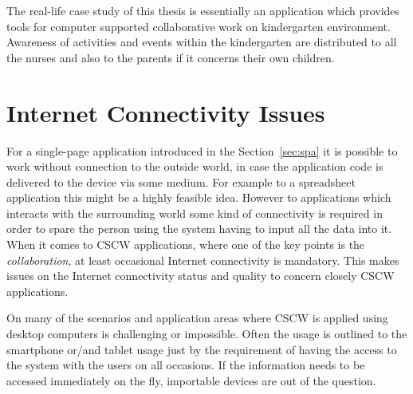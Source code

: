 The real-life case study of this thesis is essentially an application which provides tools for computer supported collaborative work on kindergarten environment. Awareness of activities and events within the kindergarten are distributed to all the nurses and also to the parents if it concerns their own children. 







\section{Internet Connectivity Issues}




For a single-page application introduced in the Section~\ref{sec:spa} it is possible to work without connection to the outside world, in case the application code is delivered to the device via some medium. For example to a spreadsheet application this might be a highly feasible idea. However to applications which interacts with the surrounding world some kind of connectivity is required in order to spare the person using the system having to input all the data into it. When it comes to CSCW applications, where one of the key points is the \textit{collaboration}, at least occasional Internet connectivity is mandatory. This makes issues on the Internet connectivity status and quality to concern closely CSCW applications. %

On many of the scenarios and application areas where CSCW is applied using desktop computers is challenging or impossible. Often the usage is outlined to the smartphone or/and tablet usage just by the requirement of having the access to the system with the users on all occasions. If the information needs to be accessed immediately on the fly, importable devices are out of the question.

